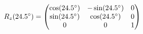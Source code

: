 \documentclass[preview]{standalone}
\begin{document}
\begin{align*}
\special{dvisvgm:raw <g id='unique000'>}R_z(24.5^\circ) = \begin{pmatrix} \cos(24.5^\circ) & -\sin(24.5^\circ) & 0 \\ \sin(24.5^\circ) & \cos(24.5^\circ) & 0 \\ 0 & 0 & 1 \end{pmatrix}\special{dvisvgm:raw </g>}
\end{align*}
\end{document}
